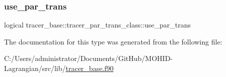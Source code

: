 \subsubsection{\texorpdfstring{use\+\_\+par\+\_\+trans}{use\_par\_trans}}
{\footnotesize\ttfamily logical tracer\+\_\+base\+::tracer\+\_\+par\+\_\+trans\+\_\+class\+::use\+\_\+par\+\_\+trans\hspace{0.3cm}{\ttfamily [private]}}



The documentation for this type was generated from the following file\+:\begin{DoxyCompactItemize}
\item 
C\+:/\+Users/administrator/\+Documents/\+Git\+Hub/\+M\+O\+H\+I\+D-\/\+Lagrangian/src/lib/\mbox{\hyperlink{tracer__base_8f90}{tracer\+\_\+base.\+f90}}\end{DoxyCompactItemize}
